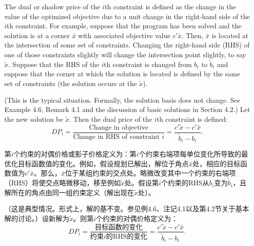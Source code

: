 \begin{original}
The dual or shadow price of the $i$th constraint is defined as the change in the value of the optimized objective due to a unit change in the right-hand side of the $i$th constraint. For example, suppose that the program has been solved and the solution is at a corner $\bar{x}$ with associated objective value $c'\bar{x}$. Then, $\bar{x}$ is located at the intersection of some set of constraints. Changing the right-hand side (RHS) of one of those constraints slightly will change the intersection point slightly, to say $\tilde{x}$. Suppose that the RHS of the $i$th constraint is changed from $b_i$ to $\tilde{b}_i$ and suppose that the corner at which the solution is located is defined by the same set of constraints (the solution occurs at the $\tilde{x}$).

(This is the typical situation. Formally, the solution basis does not change. See Example 4.6, Remark 4.1 and the discussion of basic solutions in Section 4.2.) Let the new solution be $\tilde{x}$. Then the dual price of the $i$th constraint is defined:
\[
DP_i = \frac{\text{Change in objective}}{\text{Change in RHS of constraint } i} = \frac{c'\tilde{x} - c'\bar{x}}{\tilde{b}_i - b_i}.
\]
\end{original}
\begin{translation}
第$i$个约束的对偶价格或影子价格定义为：第$i$个约束右端项每单位变化所导致的最优化目标函数值的变化。例如，假设规划已解出，解位于角点$\bar{x}$处，相应的目标函数值为$c'\bar{x}$。那么，$\bar{x}$位于某组约束的交点处。略微改变其中一个约束的右端项（RHS）将使交点略微移动，移至例如$\tilde{x}$处。假设第$i$个约束的RHS从$b_i$变为$\tilde{b}_i$，且解所在的角点由同一组约束定义（解出现在$\tilde{x}$处）。

（这是典型情况。形式上，解的基不变。参见例4.6、注记4.1以及第4.2节关于基本解的讨论。）设新解为$\tilde{x}$。则第$i$个约束的对偶价格定义为：
\[
DP_i = \frac{\text{目标函数的变化}}{\text{约束}i\text{的RHS的变化}} = \frac{c'\tilde{x} - c'\bar{x}}{\tilde{b}_i - b_i}.
\]
\end{translation}

